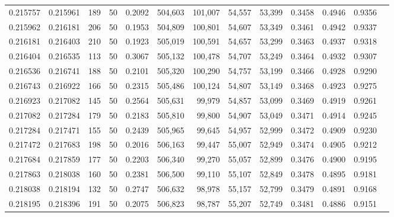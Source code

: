 \begin{tabular}{rrrrrrrrrrrrr}
0.215757 & 0.215961 &   189 &  50 &                                     0.2092 & 504,603 & 101,007 &  54,557 &  53,399 & 0.3458 & 0.4946 & 0.9356 \\
0.215962 & 0.216181 &   206 &  50 &                                     0.1953 & 504,809 & 100,801 &  54,607 &  53,349 & 0.3461 & 0.4942 & 0.9337 \\
0.216181 & 0.216403 &   210 &  50 &                                     0.1923 & 505,019 & 100,591 &  54,657 &  53,299 & 0.3463 & 0.4937 & 0.9318 \\
0.216404 & 0.216535 &   113 &  50 &                                     0.3067 & 505,132 & 100,478 &  54,707 &  53,249 & 0.3464 & 0.4932 & 0.9307 \\
0.216536 & 0.216741 &   188 &  50 &                                     0.2101 & 505,320 & 100,290 &  54,757 &  53,199 & 0.3466 & 0.4928 & 0.9290 \\
0.216743 & 0.216922 &   166 &  50 &                                     0.2315 & 505,486 & 100,124 &  54,807 &  53,149 & 0.3468 & 0.4923 & 0.9275 \\
0.216923 & 0.217082 &   145 &  50 &                                     0.2564 & 505,631 &  99,979 &  54,857 &  53,099 & 0.3469 & 0.4919 & 0.9261 \\
0.217082 & 0.217284 &   179 &  50 &                                     0.2183 & 505,810 &  99,800 &  54,907 &  53,049 & 0.3471 & 0.4914 & 0.9245 \\
0.217284 & 0.217471 &   155 &  50 &                                     0.2439 & 505,965 &  99,645 &  54,957 &  52,999 & 0.3472 & 0.4909 & 0.9230 \\
0.217472 & 0.217683 &   198 &  50 &                                     0.2016 & 506,163 &  99,447 &  55,007 &  52,949 & 0.3474 & 0.4905 & 0.9212 \\
0.217684 & 0.217859 &   177 &  50 &                                     0.2203 & 506,340 &  99,270 &  55,057 &  52,899 & 0.3476 & 0.4900 & 0.9195 \\
0.217863 & 0.218038 &   160 &  50 &                                     0.2381 & 506,500 &  99,110 &  55,107 &  52,849 & 0.3478 & 0.4895 & 0.9181 \\
0.218038 & 0.218194 &   132 &  50 &                                     0.2747 & 506,632 &  98,978 &  55,157 &  52,799 & 0.3479 & 0.4891 & 0.9168 \\
0.218195 & 0.218396 &   191 &  50 &                                     0.2075 & 506,823 &  98,787 &  55,207 &  52,749 & 0.3481 & 0.4886 & 0.9151 \\

\end{tabular}
